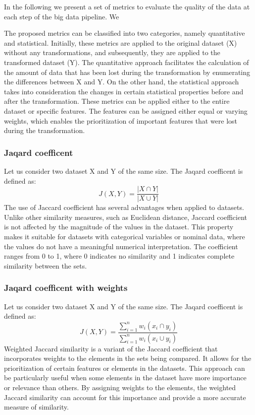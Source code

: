 In the following we present a set of metrics to evaluate the quality of the data at each step of the big data pipeline.
We

The proposed metrics can be classified into two categories, namely quantitative and statistical.
Initially, these metrics are applied to the original dataset (X) without any transformations, and subsequently, they are applied to the transformed dataset (Y).
The quantitative approach facilitates the calculation of the amount of data that has been lost during the transformation by enumerating the differences between X and Y.
On the other hand, the statistical approach takes into consideration the changes in certain statistical properties before and after the transformation.
These metrics can be applied either to the entire dataset or specific features.
The features can be assigned either equal or varying weights, which enables the prioritization of important features that were lost during the transformation.


\subsubsection{Jaqard coefficent}
Let us consider two dataset X and Y of the same size.
The Jaqard coefficent is defined as:\[J(X,Y) = \frac{|X \cap Y|}{|X \cup Y|}\]
The use of Jaccard coefficient has several advantages when applied to datasets.
Unlike other similarity measures, such as Euclidean distance, Jaccard coefficient is not affected by the magnitude of the values in the dataset.
This property makes it suitable for datasets with categorical variables or nominal data, where the values do not have a meaningful numerical interpretation.
The coefficient ranges from 0 to 1, where 0 indicates no similarity and 1 indicates complete similarity between the sets.
\subsubsection{Jaqard coefficent with weights} Let us consider two dataset X and Y of the same size. The Jaqard coefficent is defined as:\[J(X,Y) = \frac{\sum_{i=1}^{n}w_i(x_i \cap y_i)}{\sum_{i=1}^{n}w_i(x_i \cup y_i)}\]
Weighted Jaccard similarity is a variant of the Jaccard coefficient that incorporates weights to the elements in the sets being compared.
It allows for the prioritization of certain features or elements in the datasets.
This approach can be particularly useful when some elements in the dataset have more importance or relevance than others.
By assigning weights to the elements, the weighted Jaccard similarity can account for this importance and provide a more accurate measure of similarity.
